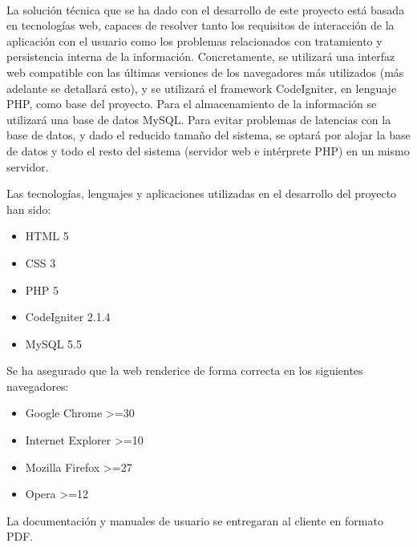 \paragraph{}La solución técnica que se ha dado con el desarrollo de este proyecto está basada en tecnologías web, capaces de resolver tanto los requisitos de interacción de la aplicación con el usuario como los problemas relacionados con tratamiento y persistencia interna de la información.
Concretamente, se utilizará una interfaz web compatible con las últimas versiones de los navegadores más utilizados (más adelante se detallará esto), y se utilizará el framework CodeIgniter, en lenguaje PHP, como base del proyecto. Para el almacenamiento de la información se utilizará una base de datos MySQL.
Para evitar problemas de latencias con la base de datos, y dado el reducido tamaño del sistema, se optará por alojar la base de datos y todo el resto del sistema (servidor web e intérprete PHP) en un mismo servidor.

\noindent Las tecnologías, lenguajes y aplicaciones utilizadas en el desarrollo del proyecto han sido:

\begin{itemize}
\item HTML 5
\item CSS 3
\item PHP 5
\item CodeIgniter 2.1.4
\item MySQL 5.5
\end{itemize}

\noindent Se ha asegurado que la web renderice de forma correcta en los siguientes navegadores:

\begin{itemize}
\item Google Chrome >=30
\item Internet Explorer >=10
\item Mozilla Firefox >=27
\item Opera >=12
\end{itemize}

\noindent La documentación y manuales de usuario se entregaran al cliente en formato PDF.


